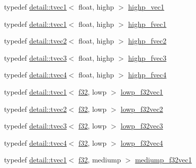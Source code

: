 \begin{DoxyCompactItemize}
\item 
typedef \hyperlink{structglm_1_1detail_1_1tvec1}{detail\+::tvec1}$<$ float, highp $>$ \hyperlink{group__gtc__type__precision_gab3f08c031846e7a95b49e81c48d920d3}{highp\+\_\+vec1}
\item 
typedef \hyperlink{structglm_1_1detail_1_1tvec1}{detail\+::tvec1}$<$ float, highp $>$ \hyperlink{group__gtc__type__precision_ga5d9f2208253856df60a57925f92ff0c8}{highp\+\_\+fvec1}
\item 
typedef \hyperlink{structglm_1_1detail_1_1tvec2}{detail\+::tvec2}$<$ float, highp $>$ \hyperlink{group__gtc__type__precision_gab58ecc53699d45f4f88d67bbff084c54}{highp\+\_\+fvec2}
\item 
typedef \hyperlink{structglm_1_1detail_1_1tvec3}{detail\+::tvec3}$<$ float, highp $>$ \hyperlink{group__gtc__type__precision_ga79b821fc8ae989b12bb43e2cd3932580}{highp\+\_\+fvec3}
\item 
typedef \hyperlink{structglm_1_1detail_1_1tvec4}{detail\+::tvec4}$<$ float, highp $>$ \hyperlink{group__gtc__type__precision_gae0de2413648d89bf5a8e598e5520a439}{highp\+\_\+fvec4}
\item 
typedef \hyperlink{structglm_1_1detail_1_1tvec1}{detail\+::tvec1}$<$ \hyperlink{group__gtc__type__precision_ga0ec999b57f5330d9021256e96038df04}{f32}, lowp $>$ \hyperlink{group__gtc__type__precision_gae802918ade0497b72c606430830f5ebb}{lowp\+\_\+f32vec1}
\item 
typedef \hyperlink{structglm_1_1detail_1_1tvec2}{detail\+::tvec2}$<$ \hyperlink{group__gtc__type__precision_ga0ec999b57f5330d9021256e96038df04}{f32}, lowp $>$ \hyperlink{group__gtc__type__precision_ga7faa2c9884c87b1e6512a966adad69e4}{lowp\+\_\+f32vec2}
\item 
typedef \hyperlink{structglm_1_1detail_1_1tvec3}{detail\+::tvec3}$<$ \hyperlink{group__gtc__type__precision_ga0ec999b57f5330d9021256e96038df04}{f32}, lowp $>$ \hyperlink{group__gtc__type__precision_ga1f878d91a5f5ab92c756244b62af7248}{lowp\+\_\+f32vec3}
\item 
typedef \hyperlink{structglm_1_1detail_1_1tvec4}{detail\+::tvec4}$<$ \hyperlink{group__gtc__type__precision_ga0ec999b57f5330d9021256e96038df04}{f32}, lowp $>$ \hyperlink{group__gtc__type__precision_ga59f7292d7ed0b7df72e6aa31010e2648}{lowp\+\_\+f32vec4}
\item 
typedef \hyperlink{structglm_1_1detail_1_1tvec1}{detail\+::tvec1}$<$ \hyperlink{group__gtc__type__precision_ga0ec999b57f5330d9021256e96038df04}{f32}, mediump $>$ \hyperlink{group__gtc__type__precision_gaf3d4077b241fbcab529fb0e0d88c0df6}{mediump\+\_\+f32vec1}

\end{DoxyCompactItemize}
